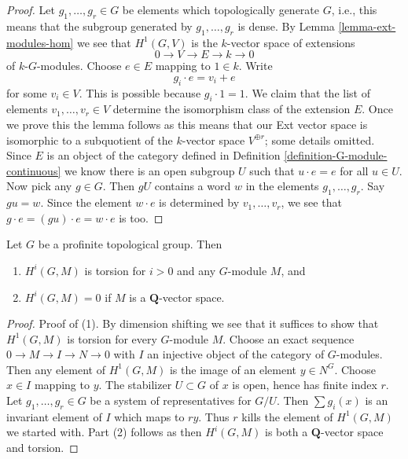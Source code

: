 \begin{proof}
Let $g_1, \ldots, g_r \in G$ be elements which topologically generate $G$,
i.e., this means that the subgroup generated by $g_1, \ldots, g_r$ is dense.
By Lemma \ref{lemma-ext-modules-hom}
we see that $H^1(G, V)$ is the $k$-vector space of extensions
$$
0 \to V \to E \to k \to 0
$$
of $k\text{-}G$-modules. Choose $e \in E$ mapping to $1 \in k$.
Write
$$
g_i \cdot e = v_i + e
$$
for some $v_i \in V$. This is possible because $g_i \cdot 1 = 1$.
We claim that the list of elements $v_1, \ldots, v_r \in V$
determine the isomorphism class of the extension $E$.
Once we prove this the lemma follows as this means that our
Ext vector space is isomorphic to a subquotient of the $k$-vector
space $V^{\oplus r}$; some details omitted.
Since $E$ is an object of the category defined in
Definition \ref{definition-G-module-continuous}
we know there is an open subgroup $U$ such that
$u \cdot e = e$ for all $u \in U$.
Now pick any $g \in G$. Then $gU$ contains a word $w$ in
the elements $g_1, \ldots, g_r$.
Say $gu = w$. Since the element $w \cdot e$ is determined by
$v_1, \ldots, v_r$, we see that $g \cdot e = (gu) \cdot e = w \cdot e$
is too.
\end{proof}

\begin{lemma}
\label{lemma-profinite-group-cohomology-torsion}
Let $G$ be a profinite topological group.
Then
\begin{enumerate}
\item $H^i(G, M)$ is torsion for $i > 0$ and any $G$-module $M$, and
\item $H^i(G, M) = 0$ if $M$ is a $\mathbf{Q}$-vector space.
\end{enumerate}
\end{lemma}

\begin{proof}
Proof of (1). By dimension shifting we see that it suffices
to show that $H^1(G, M)$ is torsion for every $G$-module $M$.
Choose an exact sequence $0 \to M \to I \to N \to 0$ with $I$
an injective object of the category of $G$-modules.
Then any element of $H^1(G, M)$ is the image of an element
$y \in N^G$. Choose $x \in I$ mapping to $y$.
The stabilizer $U \subset G$ of $x$ is open, hence
has finite index $r$. Let $g_1, \ldots, g_r \in G$ be a system
of representatives for $G/U$. Then $\sum g_i(x)$ is an invariant
element of $I$ which maps to $ry$. Thus $r$ kills the element
of $H^1(G, M)$ we started with. Part (2) follows as then
$H^i(G, M)$ is both a $\mathbf{Q}$-vector space and torsion.
\end{proof}






